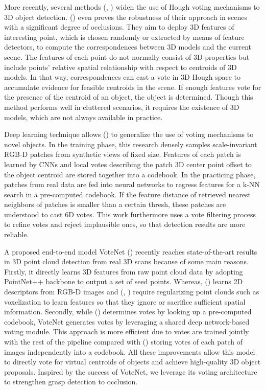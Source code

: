 More recently, several methods (\textcolor{cyan}{\cite{silberberg1984iterative}}, \textcolor{cyan}{\cite{tombari2010object}}) widen the use of Hough voting mechanisms to 3D object detection. (\textcolor{cyan}{\cite{tombari2010object}}) even proves the robustness of their approach in scenes with a significant degree of occlusions. They aim to deploy 3D features of interesting point, which is chosen randomly or extracted by means of feature detectors, to compute the correspondences between 3D models and the current scene. The features of each point do not normally consist of 3D properties but include points’ relative spatial relationship with respect to centroids of 3D models. In that way, correspondences can cast a vote in 3D Hough space to accumulate evidence for feasible centroids in the scene. If enough features vote for the presence of the centroid of an object, the object is determined. Though this method performs well in cluttered scenarios, it requires the existence of 3D models, which are not always available in practice.

Deep learning technique allows (\textcolor{cyan}{\cite{kehl2016deep}}) to generalize the use of voting mechanisms to novel objects. In the training phase, this research densely samples scale-invariant RGB-D patches from synthetic views of fixed size. Features of each patch is learned by CNNs and local votes describing the patch 3D center point offset to the object centroid are stored together into a codebook. In the practicing phase, patches from real data are fed into neural networks to regress features for a k-NN search in a pre-computed codebook. If the feature distance of retrieved nearest neighbors of patches is smaller than a certain thresh, these patches are understood to cast 6D votes. This work furthermore uses a vote filtering process to refine votes and reject implausible ones, so that detection results are more reliable.

A proposed end-to-end model VoteNet (\textcolor{cyan}{\cite{qi2019deep}}) recently reaches state-of-the-art results in 3D point cloud detection from real 3D scans because of some main reasons. Firstly, it directly learns 3D features from raw point cloud data by adopting PointNet++ backbone to output a set of seed points. Whereas, (\textcolor{cyan}{\cite{liu2016ssd}}) learns 2D descriptors from RGB-D images and (\textcolor{cyan}{\cite{song2016deep}}, \textcolor{cyan}{\cite{hou20193d}}) require regularizing point clouds such as voxelization to learn features so that they ignore or sacrifice sufficient spatial information. Secondly, while (\textcolor{cyan}{\cite{kehl2016deep}}) determines votes by looking up a pre-computed codebook, VoteNet generates votes by leveraging a shared deep network-based voting module. This approach is more efficient due to votes are trained jointly with the rest of the pipeline compared with (\textcolor{cyan}{\cite{kehl2016deep}}) storing votes of each patch of images independently into a codebook. All these improvements allow this model to directly vote for virtual centroids of objects and achieve high-quality 3D object proposals. Inspired by the success of VoteNet, we leverage its voting architecture to strengthen grasp detection to occlusion.

